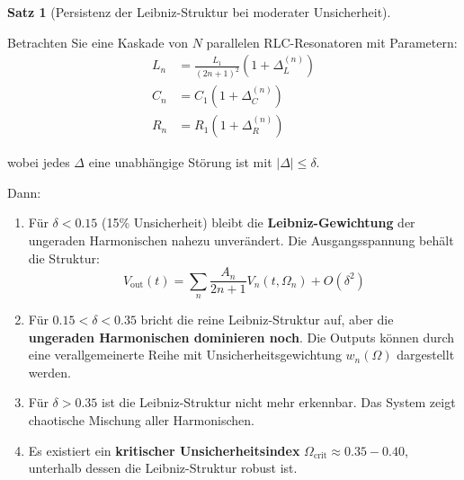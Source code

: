 \documentclass[a4paper, 12pt, twoside, openright]{report}
\theoremstyle{definition}
\theoremstyle{definition}
\newtheorem{satz}{Satz}[chapter]
\begin{document}
\begin{satz}[Persistenz der Leibniz-Struktur bei moderater Unsicherheit]
\label{satz:leibniz_unsicherheit}

Betrachten Sie eine Kaskade von $N$ parallelen RLC-Resonatoren mit Parametern:
\begin{align}
L_n &= \frac{L_1}{(2n+1)^2} (1 + \Delta_L^{(n)}) \\
C_n &= C_1 (1 + \Delta_C^{(n)}) \\
R_n &= R_1 (1 + \Delta_R^{(n)})
\end{align}

wobei jedes $\Delta$ eine unabhängige Störung ist mit $|\Delta| \leq \delta$.

Dann:

\begin{enumerate}
    \item Für $\delta < 0.15$ (15\% Unsicherheit) bleibt die \textbf{Leibniz-Gewichtung} der ungeraden Harmonischen nahezu unverändert. Die Ausgangsspannung behält die Struktur:
    \begin{equation}
    V_{\text{out}}(t) = \sum_n \frac{A_n}{2n+1} V_n(t, \Omega_n) + O(\delta^2)
    \end{equation}
    
    \item Für $0.15 < \delta < 0.35$ bricht die reine Leibniz-Struktur auf, aber die \textbf{ungeraden Harmonischen dominieren noch}. Die Outputs können durch eine verallgemeinerte Reihe mit Unsicherheitsgewichtung $w_n(\Omega)$ dargestellt werden.
    
    \item Für $\delta > 0.35$ ist die Leibniz-Struktur nicht mehr erkennbar. Das System zeigt chaotische Mischung aller Harmonischen.
    
    \item Es existiert ein \textbf{kritischer Unsicherheitsindex} $\Omega_{\text{crit}} \approx 0.35-0.40$, unterhalb dessen die Leibniz-Struktur robust ist.
\end{enumerate}

\end{satz}
\end{document}
